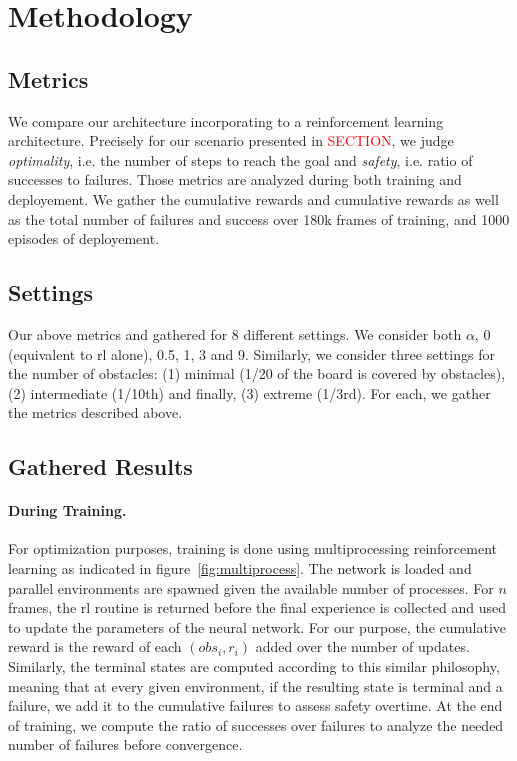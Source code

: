 \section{Methodology} 

\subsection{Metrics}
We compare our architecture incorporating \dio{} to a reinforcement learning architecture. 
Precisely for our scenario presented in \textcolor{red}{SECTION}, we judge \emph{optimality}, i.e. the number of steps to reach the goal and 
\emph{safety}, i.e. ratio of successes to failures. Those metrics are analyzed during both training and deployement. 
We gather the cumulative rewards and cumulative rewards as well as the total number of failures and success over 180k frames of training, and 1000 episodes of deployement. 

\subsection{Settings} 
Our above metrics and gathered for 8 different settings. We consider both $\alpha$, 0 (equivalent to rl alone), 0.5, 1, 3 and 9. 
Similarly, we consider three settings for the number of obstacles: (1) minimal (1/20 of the board is covered by obstacles), (2) intermediate (1/10th) and finally, 
(3) extreme (1/3rd). For each, we gather the metrics described above. 

\subsection{Gathered Results} 
\paragraph{During Training.} For optimization purposes, training is done using multiprocessing reinforcement learning as indicated in figure~\ref{fig:multiprocess}. 
The network is loaded and parallel environments are spawned given the available number of processes. For $n$ frames, the rl routine is returned before the final experience is collected 
and used to update the parameters of the neural network. For our purpose, the cumulative reward is the reward of each $(obs_i, r_i)$ added over the number of updates. 
Similarly, the terminal states are computed according to this similar philosophy, meaning that at every given environment, if the resulting state is terminal and a failure, we add it to the cumulative failures to assess 
safety overtime. At the end of training, we compute the ratio of successes over failures to analyze the needed number of failures before convergence.

